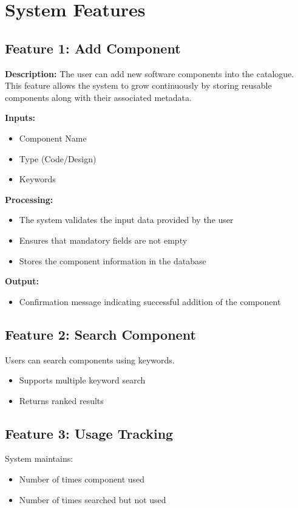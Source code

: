 \documentclass[12pt]{scrreprt}
\begin{document}
\chapter{System Features}

\section{Feature 1: Add Component}

\textbf{Description:} The user can add new software components into the catalogue. This feature allows the system to grow continuously by storing reusable components along with their associated metadata.

\textbf{Inputs:}
\begin{itemize}
    \item Component Name
    \item Type (Code/Design)
    \item Keywords
\end{itemize}

\textbf{Processing:}
\begin{itemize}
    \item The system validates the input data provided by the user
    \item Ensures that mandatory fields are not empty
    \item Stores the component information in the database
\end{itemize}

\textbf{Output:}
\begin{itemize}
    \item Confirmation message indicating successful addition of the component
\end{itemize}

\section{Feature 2: Search Component}
Users can search components using keywords.

\begin{itemize}
    \item Supports multiple keyword search
    \item Returns ranked results
\end{itemize}

\section{Feature 3: Usage Tracking}
System maintains:
\begin{itemize}
    \item Number of times component used
    \item Number of times searched but not used
\end{itemize}
\end{document}
